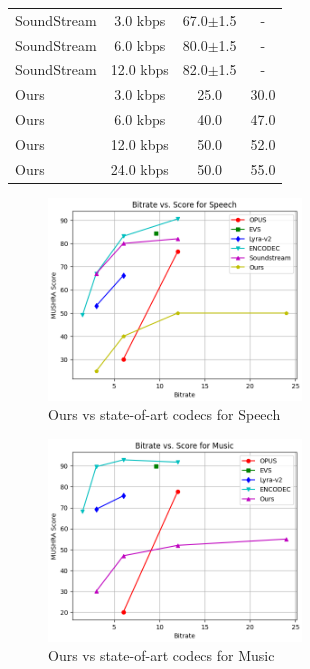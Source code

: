 \documentclass[12pt]{report}
\newcommand{\pmr}[1]{\scriptsize$\pm$#1}
\begin{document}
\begin{table}[H]
\begin{tabular}{lccc}
\hline SoundStream        & 3.0 kbps     & 67.0\pmr{1.5} & - \\
SoundStream               & 6.0 kbps     & 80.0\pmr{1.5} & - \\
SoundStream               & 12.0 kbps    & 82.0\pmr{1.5} & - \\
\hline Ours               & 3.0 kbps     & 25.0 & 30.0 \\
Ours               & 6.0 kbps     & 40.0 & 47.0 \\
Ours               & 12.0 kbps     & 50.0 & 52.0 \\
Ours               & 24.0 kbps     & 50.0 & 55.0 \\
\hline
\end{tabular}
\label{tab:intermodelcomp}
\end{table} 

\begin{figure}[H]
\centering
\includegraphics[width=0.6\textwidth]{Images/speechscore.png}
\caption{Ours vs state-of-art codecs for Speech}
\end{figure}

\begin{figure}[H]
\centering
\includegraphics[width=0.6\textwidth]{Images/mucisscore.png}
\caption{Ours vs state-of-art codecs for Music}
\end{figure}
\end{document}
